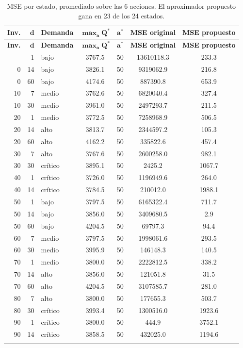 \documentclass[11pt,letterpaper]{article}
\begin{document}
\begin{longtable}{rrlS[table-format=4.1]cS[table-format=8.1]S[table-format=4.1]}
\toprule
\textbf{Inv.} & $\bm{d}$ & \textbf{Demanda} & {$\bm{\max_a Q^{*}}$} & $\bm{a^{*}}$ &
{\textbf{MSE original}} & {\textbf{MSE propuesto}} \\
\midrule
\endfirsthead
\toprule
\textbf{Inv.} & $\bm{d}$ & \textbf{Demanda} & {$\bm{\max_a Q^{*}}$} & $\bm{a^{*}}$ &
{\textbf{MSE original}} & {\textbf{MSE propuesto}} \\
\midrule
\endhead
\bottomrule
{} &  1 & bajo    & 3767.5 & 50 & 13610118.3 &  233.3 \\
  0 & 14 & bajo    & 3826.1 & 50 &  9319062.9 &  216.8 \\
  0 & 60 & bajo    & 4174.6 & 50 &   887390.8 &  653.9 \\
 10 &  7 & medio   & 3762.6 & 50 &  6820040.4 &  327.4 \\
 10 & 30 & medio   & 3961.0 & 50 &  2497293.7 &  211.5 \\
 20 &  1 & medio   & 3772.5 & 50 &  7258968.9 &  506.5 \\
 20 & 14 & alto    & 3813.7 & 50 &  2344597.2 &  105.3 \\
 20 & 60 & alto    & 4162.2 & 50 &   335822.6 &  457.4 \\
 30 &  7 & alto    & 3767.6 & 50 &  2600258.0 &  982.1 \\
 30 & 30 & crítico & 3895.1 & 50 &     2425.2 & 1067.7 \\
 40 &  1 & crítico & 3726.0 & 50 &  1196949.6 &  264.0 \\
 40 & 14 & crítico & 3784.5 & 50 &   210012.0 & 1988.1 \\
 50 &  1 & bajo    & 3797.5 & 50 &  6165322.4 &  711.7 \\
 50 & 14 & bajo    & 3856.0 & 50 &  3409680.5 &    2.9 \\
 50 & 60 & bajo    & 4204.5 & 50 &    69797.3 &   94.4 \\
 60 &  7 & medio   & 3797.5 & 50 &  1998061.6 &  293.5 \\
 60 & 30 & medio   & 3995.9 & 50 &   146148.3 &  140.5 \\
 70 &  1 & medio   & 3800.0 & 50 &  2222812.5 &  338.2 \\
 70 & 14 & alto    & 3856.0 & 50 &   121051.8 &   31.5 \\
 70 & 60 & alto    & 4204.5 & 50 &  3107585.7 &  281.0 \\
 80 &  7 & alto    & 3800.0 & 50 &   177655.3 &  503.7 \\
 80 & 30 & crítico & 3993.4 & 50 &  1300516.0 & 1923.6 \\
 90 &  1 & crítico & 3800.0 & 50 &      444.9 & 3752.1 \\
 90 & 14 & crítico & 3858.5 & 50 &   432025.0 & 1194.6 \\
\caption{MSE por estado, promediado sobre las 6 acciones. El aproximador propuesto
gana en 23 de los 24 estados.}
\label{tab:detalle}
\end{longtable}
\end{document}
